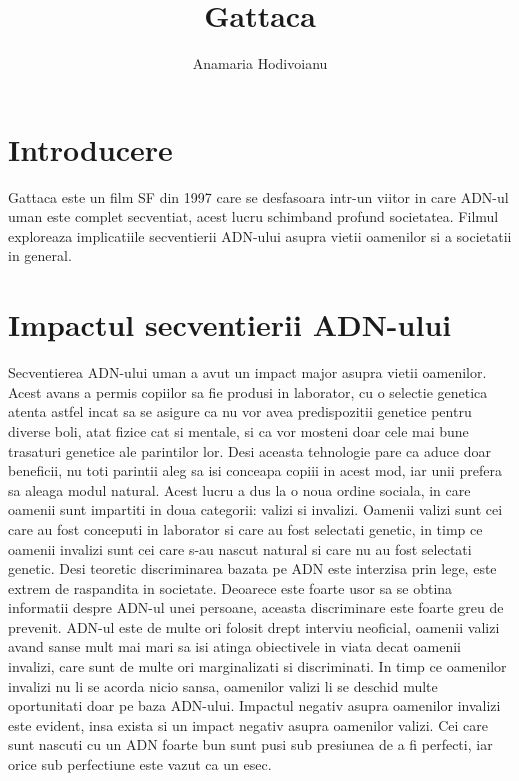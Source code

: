 \documentclass{article}
\title{Gattaca}
\author{Anamaria Hodivoianu}
\begin{document}
\maketitle

\section{Introducere}
Gattaca este un film SF din 1997 care se desfasoara intr-un viitor in care ADN-ul uman este complet secventiat, acest lucru schimband profund societatea. Filmul exploreaza implicatiile secventierii ADN-ului asupra vietii oamenilor si a societatii in general.

\section{Impactul secventierii ADN-ului}
Secventierea ADN-ului uman a avut un impact major asupra vietii oamenilor. Acest avans a permis copiilor sa fie produsi in laborator, cu o selectie genetica atenta astfel incat sa se asigure ca nu vor avea predispozitii genetice pentru diverse boli, atat fizice cat si mentale, si ca vor mosteni doar cele mai bune trasaturi genetice ale parintilor lor. Desi aceasta tehnologie pare ca aduce doar beneficii, nu toti parintii aleg sa isi conceapa copiii in acest mod, iar unii prefera sa aleaga modul natural. Acest lucru a dus la o noua ordine sociala, in care oamenii sunt impartiti in doua categorii: valizi si invalizi. Oamenii valizi sunt cei care au fost conceputi in laborator si care au fost selectati genetic, in timp ce oamenii invalizi sunt cei care s-au nascut natural si care nu au fost selectati genetic. Desi teoretic discriminarea bazata pe ADN este interzisa prin lege, este extrem de raspandita in societate. Deoarece este foarte usor sa se obtina informatii despre ADN-ul unei persoane, aceasta discriminare este foarte greu de prevenit. ADN-ul este de multe ori folosit drept interviu neoficial, oamenii valizi avand sanse mult mai mari sa isi atinga obiectivele in viata decat oamenii invalizi, care sunt de multe ori marginalizati si discriminati. In timp ce oamenilor invalizi nu li se acorda nicio sansa, oamenilor valizi li se deschid multe oportunitati doar pe baza ADN-ului. Impactul negativ asupra oamenilor invalizi este evident, insa exista si un impact negativ asupra oamenilor valizi. Cei care sunt nascuti cu un ADN foarte bun sunt pusi sub presiunea de a fi perfecti, iar orice sub perfectiune este vazut ca un esec.
\end{document}
